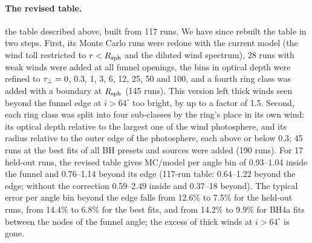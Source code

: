 \paragraph{The revised table.}
 the table described above, built from 117 runs.
We have since rebuilt the table in two steps.
First, its Monte Carlo runs were redone with the current model (the wind toll restricted to $r < R_{\rm sph}$ and the diluted wind spectrum), 28 runs with weak winds were added at all funnel openings, the bins in optical depth were refined to $\tau_\perp = 0$, 0.3, 1, 3, 6, 12, 25, 50 and 100, and a fourth ring class was added with a boundary at $R_{\rm sph}$ (145 runs).
This version left thick winds seen beyond the funnel edge at $i > 64^\circ$ too bright, by up to a factor of 1.5.
Second, each ring class was split into four sub-classes by the ring's place in its own wind: its optical depth relative to the largest one of the wind photosphere, and its radius relative to the outer edge of the photosphere, each above or below 0.3; 45 runs at the best fits of all BH presets and sources were added (190 runs).
\ifheldout
For 17 held-out runs, the revised table gives MC/model per angle bin of 0.93--1.04 inside the funnel and 0.76--1.14 beyond its edge (117-run table: 0.64--1.22 beyond the edge; without the correction 0.59--2.49 inside and 0.37--18 beyond).
The typical error per angle bin beyond the edge falls from 12.6\% to 7.5\% for the held-out runs, from 14.4\% to 6.8\% for the best fits, and from 14.2\% to 9.9\% for BH4a fits between the nodes of the funnel angle; the excess of thick winds at $i > 64^\circ$ is gone.
\fi %


